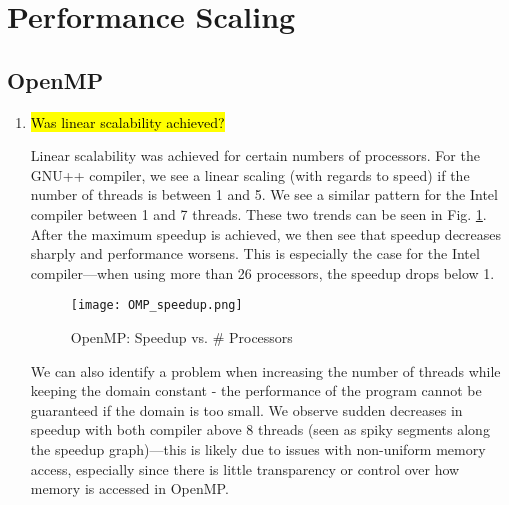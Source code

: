 \documentclass{article}
\begin{document}

\section{Performance Scaling}
\subsection{OpenMP}
\begin{enumerate}
	\item \hl{Was linear scalability achieved?}

	Linear scalability was achieved for certain numbers of processors. For the GNU++ compiler, we see a linear scaling (with regards to speed) if the number of threads is between 1 and 5. We see a similar pattern for the Intel compiler between 1 and 7 threads. These two trends can be seen in Fig. \ref{fig:omp_speedup}. After the maximum speedup is achieved, we then see that speedup decreases sharply and performance worsens. This is especially the case for the Intel compiler---when using more than 26 processors, the speedup drops below 1. 

	\begin{figure}[h!] %
	 	\begin{center}
	 		\texttt{[image: OMP\_speedup.png]} %
	 		\caption{OpenMP: Speedup vs. \# Processors}
	 		\label{fig:omp_speedup}
	 	\end{center}
	\end{figure}

	We can also identify a problem when increasing the number of threads while keeping the domain constant - the performance of the program cannot be guaranteed if the domain is too small. We observe sudden decreases in speedup with both compiler above 8 threads (seen as spiky segments along the speedup graph)---this is likely due to issues with non-uniform memory access, especially since there is little transparency or control over how memory is accessed in OpenMP.


\end{enumerate}
\end{document}
